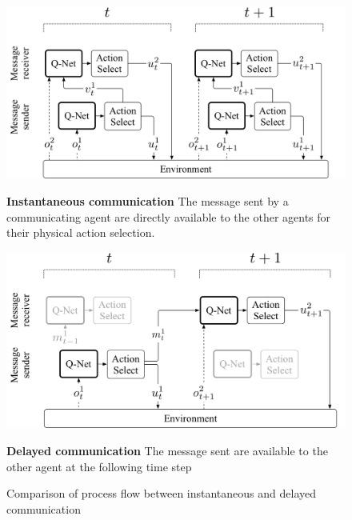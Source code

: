 \begin{figure}[ht]
\centering
  \begin{minipage}[t]{0.5\textwidth} %
    \includegraphics[width=\linewidth]{imgs/com-instant.png}
   \caption*{\textbf{Instantaneous communication} The message sent by a communicating agent are directly available to the other agents for their physical action selection.}
  \end{minipage}%
  \hfill
  \begin{minipage}[t]{0.5\textwidth}
    \includegraphics[width=\linewidth]{imgs/com-delay.png}
    \caption*{\textbf{Delayed communication} The message sent are available to the other agent at the following time step}
  \end{minipage}
  \caption{Comparison of process flow between instantaneous and delayed communication \protect\footnotemark}
  \label{fig:com-channels}
\end{figure}

